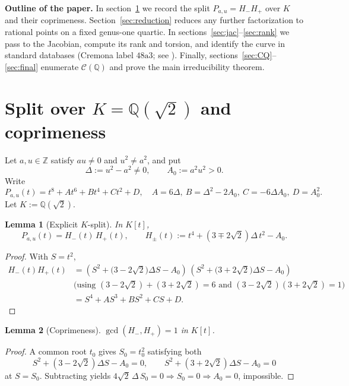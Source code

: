 \documentclass[12pt]{article}
\newtheorem{lemma}{Lemma}
\theoremstyle{remark}
\theoremstyle{definition}
\begin{document}
\medskip
\noindent\textbf{Outline of the paper.}
In section~\ref{sec:split} we record the split \(P_{a,u}=H_-H_+\) over \(K\) and their coprimeness.
Section~\ref{sec:reduction} reduces any further factorization to rational points on a fixed genus-one quartic.
In sections~\ref{sec:jac}--\ref{sec:rank} we pass to the Jacobian, compute its rank and torsion, and identify the curve in standard databases (Cremona label \(\mathrm{48a3}\); see \cite{CremonaEC,LMFDB48a3}).
Finally, sections~\ref{sec:CQ}--\ref{sec:final} enumerate \(\mathcal{C}(\mathbb{Q})\) and prove the main irreducibility theorem.


\section{Split over \texorpdfstring{$K=\mathbb{Q}(\sqrt2)$}{K=Q(sqrt2)} and coprimeness}\label{sec:split}
Let $a,u\in\mathbb{Z}$ satisfy $au\neq0$ and $u^2\neq a^2$, and put
\[
\Delta:=u^2-a^2\neq0,\qquad A_0:=a^2u^2>0.
\]
Write
\[
P_{a,u}(t)=t^8+At^6+Bt^4+Ct^2+D,\quad
A=6\Delta,\ B=\Delta^2-2A_0,\ C=-6\Delta A_0,\ D=A_0^2.
\]
Let $K:=\mathbb{Q}(\sqrt2)$.

\begin{lemma}[Explicit $K$-split]\label{lem:split}
In $K[t]$,
\[
P_{a,u}(t)=H_-(t)\,H_+(t),\qquad
H_\pm(t):=t^4+(3\mp2\sqrt2)\Delta\,t^2-A_0.
\]
\end{lemma}

\begin{proof}
With $S=t^2$,
\begin{align*}
H_-(t)H_+(t)
&=(S^2+\bigl(3-2\sqrt2\bigr)\Delta S-A_0)\,(S^2+\bigl(3+2\sqrt2\bigr)\Delta S-A_0)\\
&\text{(using $(3-2\sqrt2)+(3+2\sqrt2)=6$ and $(3-2\sqrt2)(3+2\sqrt2)=1$)}\\
&= S^4+A S^3+B S^2+C S+D.
\end{align*}
\end{proof}

\begin{lemma}[Coprimeness]\label{lem:gcd1}
$\gcd(H_-,H_+)=1$ in $K[t]$.
\end{lemma}

\begin{proof}
A common root $t_0$ gives $S_0=t_0^2$ satisfying both
\[
S^2+(3-2\sqrt2)\Delta S-A_0=0,\qquad
S^2+(3+2\sqrt2)\Delta S-A_0=0
\]
at $S=S_0$. Subtracting yields
$4\sqrt2\,\Delta\,S_0=0\Rightarrow S_0=0\Rightarrow A_0=0$, impossible.
\end{proof}
\end{document}
